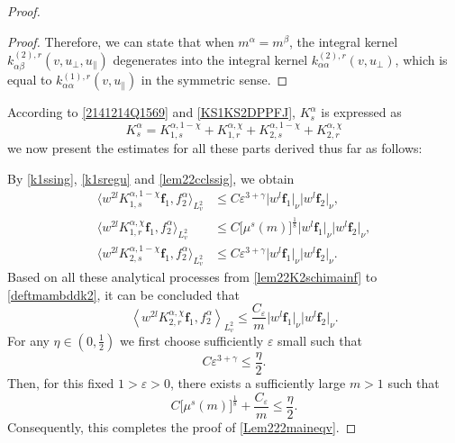 \documentclass[reqno]{amsart}
\numberwithin{equation}{section}
\numberwithin{equation}{section}
\begin{document}
\begin{proof}
\begin{proof}
			Therefore, we can state that when $m^{\alpha}=m^{\beta}$, the integral kernel $k_{\alpha \beta}^{(2),r}(v,u_{\perp},u_{\parallel})$ degenerates into the integral kernel $k_{\alpha \alpha}^{(2),r}(v,u_{\perp})$, which is equal to $k_{\alpha \alpha}^{(1),r}(v,u_{\parallel})$ in the symmetric sense.
			
		\end{proof}
		
		According to \eqref{2141214Q1569} and \eqref{KS1KS2DPPFJ}, $K_{s}^{\alpha}$ is expressed as 
		\begin{equation*}
			K_{s}^{\alpha}=K_{1,s}^{\alpha,1-\chi}+K_{1,r}^{\alpha,\chi}+K_{2,s}^{\alpha,1-\chi}+K_{2,r}^{\alpha,\chi}
		\end{equation*}
		we now present the estimates for all these parts derived thus far as follows:
		
		By \eqref{k1ssing}, \eqref{k1sregu} and \eqref{lem22cclssig}, we obtain
		\begin{align*}
			\big \langle  w^{2l}K_{1,s}^{\alpha,1-\chi}\mathbf{f}_1,f^{\alpha}_2\big \rangle_{L^{2}_{v}} &\leq C \varepsilon^{3+\gamma} \big|w^{l} \mathbf{f}_1\big|_\nu \big|w^{l} \mathbf{f}_2\big|_\nu,\\
				\big \langle  w^{2l}K_{1,r}^{\alpha,\chi}\mathbf{f}_1,f^{\alpha}_2\big \rangle_{L^{2}_{v}} &\leq C \big[\mu^s(m)\big]^{\frac{1}{8}} \big|w^{l} \mathbf{f}_1\big|_\nu \big|w^{l} \mathbf{f}_2\big|_\nu,\\
				\big \langle  w^{2l}K_{2,s}^{\alpha,1-\chi}\mathbf{f}_1,f^{\alpha}_2\big \rangle_{L^{2}_{v}} &\leq C \varepsilon^{3+\gamma} \big|w^{l} \mathbf{f}_1\big|_\nu \big|w^{l} \mathbf{f}_2\big|_\nu.
		\end{align*}
		Based on all these analytical processes from \eqref{lem22K2schimainf} to \eqref{deftmambddk2}, it can be concluded that 
		\begin{equation*}
			\left \langle  w^{2l}K_{2,r}^{\alpha,\chi}\mathbf{f}_1,f^{\alpha}_2\right \rangle_{L^{2}_{v}} \leq \frac{C_\varepsilon}{m} \big|w^{l} \mathbf{f}_1\big|_\nu \big|w^{l} \mathbf{f}_2\big|_\nu.
		\end{equation*}
		\noindent For any $\eta \in (0,\frac{1}{2})$ we first choose sufficiently $\varepsilon$ small such that
		\begin{equation*}
			C\varepsilon^{3+\gamma} \leq \frac{\eta}{2}.
		\end{equation*}
		Then, for this fixed $1>\varepsilon>0$, there exists a sufficiently large $m>1$ such that 
		\begin{equation*}
			C \big[\mu^s(m)\big]^{\frac{1}{8}}+\frac{C_\varepsilon}{m} \leq \frac{\eta}{2}.
		\end{equation*}
	 Consequently, this completes the proof of \eqref{Lem222maineqv}.
	 

\end{proof}
\end{document}
